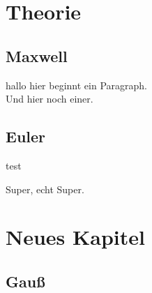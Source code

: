 \documentclass[12pt, twoside, 
               a4paper,
               open=any,
               titlepage,
               bibliography=totoc,
               xcolor=dvipsnames,
               ]{scrbook}
\begin{document}
    \tableofcontents

    \chapter{Theorie}
    \section{Maxwell}
    hallo hier beginnt ein Paragraph.\\
    Und hier noch einer.

    \newpage
    \section{Euler}
    test
    \newpage

    Super, echt Super.

    \newpage

    \chapter{Neues Kapitel}
    \section{Gauß}

    \autocite{elk}

    \newpage

    \FloatBarrier
    \clearpage

    
    \setcounter{tocdepth}{1}
    \setcounter{table}{0}
    \setcounter{equation}{0}
    \setcounter{figure}{0}

    \FloatBarrier
    \clearpage
    \printbibliography
    
\end{document}
